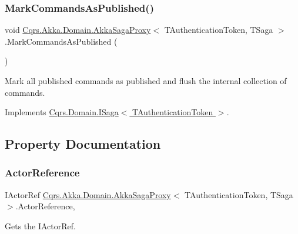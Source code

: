 \subsubsection{\texorpdfstring{Mark\+Commands\+As\+Published()}{MarkCommandsAsPublished()}}
{\footnotesize\ttfamily void \hyperlink{classCqrs_1_1Akka_1_1Domain_1_1AkkaSagaProxy}{Cqrs.\+Akka.\+Domain.\+Akka\+Saga\+Proxy}$<$ T\+Authentication\+Token, T\+Saga $>$.Mark\+Commands\+As\+Published (\begin{DoxyParamCaption}{ }\end{DoxyParamCaption})}



Mark all published commands as published and flush the internal collection of commands. 



Implements \hyperlink{interfaceCqrs_1_1Domain_1_1ISaga_a4ce7c6cb939b5d6a5afb7538da3d1680_a4ce7c6cb939b5d6a5afb7538da3d1680}{Cqrs.\+Domain.\+I\+Saga$<$ T\+Authentication\+Token $>$}.



\subsection{Property Documentation}
\mbox{\label{classCqrs_1_1Akka_1_1Domain_1_1AkkaSagaProxy_a5f1a7eae545d74336856ca7ec7625334_a5f1a7eae545d74336856ca7ec7625334}} 
\subsubsection{\texorpdfstring{Actor\+Reference}{ActorReference}}
{\footnotesize\ttfamily I\+Actor\+Ref \hyperlink{classCqrs_1_1Akka_1_1Domain_1_1AkkaSagaProxy}{Cqrs.\+Akka.\+Domain.\+Akka\+Saga\+Proxy}$<$ T\+Authentication\+Token, T\+Saga $>$.Actor\+Reference\hspace{0.3cm}{\ttfamily [get]}, {\ttfamily [set]}}



Gets the I\+Actor\+Ref. 

\mbox{\label{classCqrs_1_1Akka_1_1Domain_1_1AkkaSagaProxy_acb65bb91f7dfacc6eca8e12b6a772b20_acb65bb91f7dfacc6eca8e12b6a772b20}} 
